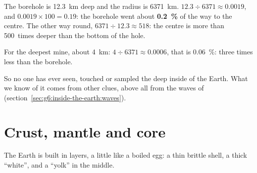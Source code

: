 \begin{example}\label{ex:g6:inside-the-earth:kola}
The borehole is 12.3~km deep and the radius is 6371~km.
$12.3 \div 6371 \approx 0.0019$, and $0.0019 \times 100 = 0.19$: the
borehole went about \textbf{0.2~\%} of the way to the centre. The other way
round, $6371 \div 12.3 \approx 518$: the centre is more than 500~times
deeper than the bottom of the hole.

For the deepest mine, about 4~km: $4 \div 6371 \approx 0.0006$, that is
0.06~\%: three times less than the borehole.
\end{example}

So no one has ever seen, touched or sampled the deep inside of the Earth.
What we know of it comes from other clues, above all from the waves of
 (section~\ref{sec:g6:inside-the-earth:waves}).

\section{Crust, mantle and core}

The Earth is built in layers, a little like a boiled egg: a thin brittle
shell, a thick ``white'', and a ``yolk'' in the middle.

